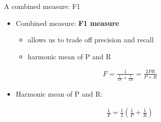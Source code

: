 \documentclass[serif, aspectratio=169]{beamer}
\begin{document}
\begin{frame}{A combined measure: F1}
    \begin{itemize}
        \item Combined measure: \textbf{F1 measure}
        \begin{itemize}
            \item allows us to trade off precision and recall
            \item harmonic mean of P and R
        \end{itemize}
    \end{itemize}
    \begin{align*}
        F = \frac{1}{\frac{1}{2P} + \frac{1}{2R}} = \frac{2PR}{P + R}
    \end{align*}
    
    \begin{itemize}
        \item Harmonic mean of P and R: 
    \end{itemize}
        \begin{align*}
        \frac{1}{F}=\frac{1}{2}(\frac{1}{P}+\frac{1}{R})
    \end{align*}
\end{frame}
\end{document}
